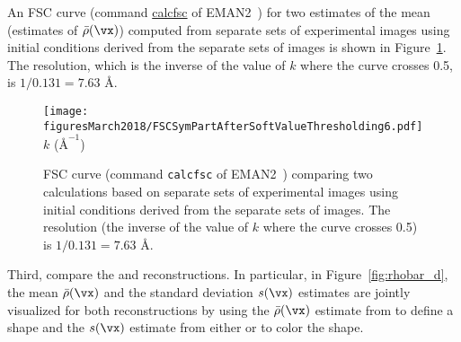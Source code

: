 An FSC curve (command \url{calcfsc} of
EMAN2~\cite{TangPengBaldwinMannJiangReesLudtkeJSB2007EMAN2})
for two estimates of the mean (estimates of $\bar\rho(\vx)$) computed from
separate sets of experimental images using initial conditions derived from
the separate sets of images is shown in
Figure~\ref{fig:HK97:experimentalSymPart:FSC}.
The resolution, which is the inverse of the value of $k$ where the curve
crosses 0.5, is $1/0.131=7.63$ {\AA}.
\begin{figure}
\begin{center}
\texttt{[image: figuresMarch2018/FSCSymPartAfterSoftValueThresholding6.pdf]}
\\
$k$ ($\mbox{\AA}^{-1}$)
\end{center}
\vspace*{-.2in}
\caption{
\label{fig:HK97:experimentalSymPart:FSC}
FSC curve (command {\tt calcfsc} of
EMAN2~\cite{TangPengBaldwinMannJiangReesLudtkeJSB2007EMAN2})
comparing two {\heterosymparticles} calculations based on
separate sets of experimental images using initial conditions derived from
the separate sets of images.
The resolution (the inverse of the value of $k$ where the curve crosses
0.5) is $1/0.131=7.63$ {\AA}.
}
\end{figure}
\par
Third, compare the {\heterosymparticles} and {\heterosymstatistics}
reconstructions.
In particular, in Figure~\ref{fig:rhobar_d}, the mean $\bar\rho(\vx)$ and
the standard deviation $s(\vx)$ estimates are jointly visualized for both
reconstructions by
using the $\bar\rho(\vx)$ estimate from {\heterosymparticles} to define a
shape and the $s(\vx)$ estimate from either {\heterosymparticles} or
{\heterosymstatistics} to color the shape.
